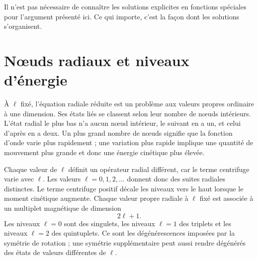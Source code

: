 \begin{classroomqa}\end{classroomqa}

\begin{classroomqa}\end{classroomqa}

Il n’est pas nécessaire de connaître les solutions explicites en fonctions spéciales pour l’argument présenté ici. Ce qui importe, c’est la façon dont les solutions s’organisent.

\section{Nœuds radiaux et niveaux d’énergie}

À \(\ell\) fixé, l’équation radiale réduite est un problème aux valeurs propres ordinaire à une dimension. Ses états liés se classent selon leur nombre de nœuds intérieurs. L’état radial le plus bas n’a aucun nœud intérieur, le suivant en a un, et celui d’après en a deux. Un plus grand nombre de nœuds signifie que la fonction d’onde varie plus rapidement ; une variation plus rapide implique une quantité de mouvement plus grande et donc une énergie cinétique plus élevée.

Chaque valeur de \(\ell\) définit un opérateur radial différent, car le terme centrifuge varie avec \(\ell\). Les valeurs \(\ell=0,1,2,\ldots\) donnent donc des suites radiales distinctes. Le terme centrifuge positif décale les niveaux vers le haut lorsque le moment cinétique augmente. Chaque valeur propre radiale à \(\ell\) fixé est associée à un multiplet magnétique de dimension
\begin{equation}
2\ell+1.
\end{equation}
Les niveaux \(\ell=0\) sont des singulets, les niveaux \(\ell=1\) des triplets et les niveaux \(\ell=2\) des quintuplets. Ce sont les dégénérescences imposées par la symétrie de rotation ; une symétrie supplémentaire peut aussi rendre dégénérés des états de valeurs différentes de \(\ell\).

